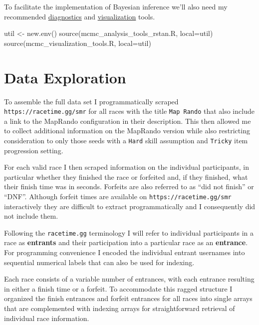 \documentclass[
  letterpaper,
  DIV=11,
  numbers=noendperiod]{scrartcl}
\newenvironment{Shaded}{\begin{snugshade}}{\end{snugshade}}
\newcommand{\AttributeTok}[1]{\textcolor[rgb]{0.40,0.45,0.13}{#1}}
\newcommand{\FunctionTok}[1]{\textcolor[rgb]{0.28,0.35,0.67}{#1}}
\newcommand{\NormalTok}[1]{\textcolor[rgb]{0.00,0.23,0.31}{#1}}
\newcommand{\OtherTok}[1]{\textcolor[rgb]{0.00,0.23,0.31}{#1}}
\newcommand{\StringTok}[1]{\textcolor[rgb]{0.13,0.47,0.30}{#1}}
\begin{document}
To facilitate the implementation of Bayesian inference we'll also need
my recommended
\href{https://github.com/betanalpha/mcmc_diagnostics}{diagnostics} and
\href{https://github.com/betanalpha/mcmc_visualization_tools}{visualization}
tools.

\begin{Shaded}
\begin{Highlighting}[]
\NormalTok{util }\OtherTok{\textless{}{-}} \FunctionTok{new.env}\NormalTok{()}
\FunctionTok{source}\NormalTok{(}\StringTok{\textquotesingle{}mcmc\_analysis\_tools\_rstan.R\textquotesingle{}}\NormalTok{, }\AttributeTok{local=}\NormalTok{util)}
\FunctionTok{source}\NormalTok{(}\StringTok{\textquotesingle{}mcmc\_visualization\_tools.R\textquotesingle{}}\NormalTok{, }\AttributeTok{local=}\NormalTok{util)}
\end{Highlighting}
\end{Shaded}

\section{Data Exploration}\label{data-exploration}

To assemble the full data set I programmatically scraped
\texttt{https://racetime.gg/smr} for all races with the title
\texttt{Map\ Rando} that also include a link to the MapRando
configuration in their description. This then allowed me to collect
additional information on the MapRando version while also restricting
consideration to only those seeds with a \texttt{Hard} skill assumption
and \texttt{Tricky} item progression setting.

For each valid race I then scraped information on the individual
participants, in particular whether they finished the race or forfeited
and, if they finished, what their finish time was in seconds. Forfeits
are also referred to as ``did not finish'' or ``DNF''. Although forfeit
times are available on \texttt{https://racetime.gg/smr} interactively
they are difficult to extract programmatically and I consequently did
not include them.

Following the \texttt{racetime.gg} terminology I will refer to
individual participants in a race as \textbf{entrants} and their
participation into a particular race as an \textbf{entrance}. For
programming convenience I encoded the individual entrant usernames into
sequential numerical labels that can also be used for indexing.

Each race consists of a variable number of entrances, with each entrance
resulting in either a finish time or a forfeit. To accommodate this
ragged structure I organized the finish entrances and forfeit entrances
for all races into single arrays that are complemented with indexing
arrays for straightforward retrieval of individual race information.
\end{document}
